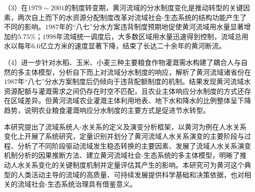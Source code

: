 \begin{cabstract}
（3）在$1979 \sim 2001$的制度转变期，黄河流域的分水制度变化是推动转型的关键因素，两次自上而下的水资源分配制度改革对流域社会-生态系统的结构功能产生了不同的影响。$1987$年的“八七”分水方案违背制度预期地促使黄河流域用水量显著增加约$5.75\%$；$1998$年流域统一调度后，大多数区域用水量迅速得到控制，流域总用水以每年$6.6$亿立方米的速度显著下降，结束了长达二十余年的黄河断流。

（4）进一步针对水稻、玉米、小麦三种主要粮食作物灌溉需水构建了耦合人与自然的多主体模型，分析自下而上对流域分水制度的响应，解析了黄河流域诸省份在$1987$年“八七”分水方案制度后仍倾向于违背配额制度的机制。结果发现黄河流域水资源配额与灌溉需求之间仍存在时空不匹配，且农业主体响应分水制度的方式还存在区域差异。但黄河流域农业灌溉主体利用地表、地下水和降水的比例整体呈下降趋势，说明农业粮食灌溉响应分水制度的主要方式是促进节水转型。

本研究提出了流域系统人-水关系的定义及演变分析框架，以黄河为例在人水关系变化上开展了系统研究，定量识别并划分了黄河流域人水关系演变的主要阶段与过程、分析了不同阶段驱动流域发生稳态转换的主要因素、发展了流域人水关系演变机制分析的因果推断方法、建立黄河流域社会-生态系统的多主体模型，明晰了推动人水关系变化的关键制度机制并定量评估其产生的影响。本研究可为黄河这个典型的人类活动主导的流域的高质量、可持续发展提供科学基础和决策依据，也对相关的流域社会-生态系统治理具有借鉴意义。


\end{cabstract}



